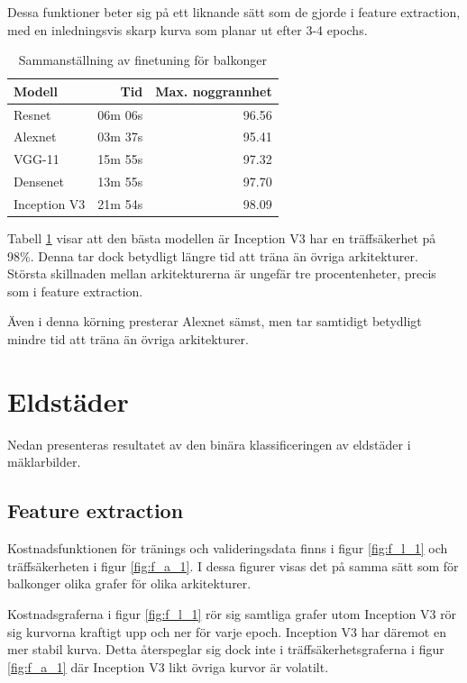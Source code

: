\documentclass[]{kththesis}
\begin{document}
Dessa funktioner beter sig på ett liknande sätt som de gjorde i feature extraction, med en inledningsvis skarp kurva som planar ut efter 3-4 epochs.



\begin{table}[!htbp]
  \centering
  \begin{tabular}{|l|r|r|}
    Modell & Tid & Max. noggrannhet \\ 
    \hline
    Resnet       & 06m 06s & 96.56 \\
    Alexnet      & 03m 37s & 95.41 \\
    VGG-11       & 15m 55s & 97.32 \\
    Densenet     & 13m 55s & 97.70 \\
    Inception V3 & 21m 54s & 98.09 \\
  \end{tabular}
  
  \caption{Sammanställning av finetuning för balkonger}
  \label{fig:sam_2}
  
\end{table}


Tabell \ref{fig:sam_2} visar att den bästa modellen är Inception V3 har en träffsäkerhet på 98\%. 
Denna tar dock betydligt längre tid att träna än övriga arkitekturer. 
Största skillnaden mellan arkitekturerna är ungefär tre procentenheter, precis som i feature extraction.

Även i denna körning presterar Alexnet sämst, men tar samtidigt betydligt mindre tid att träna än övriga arkitekturer.


\section{Eldstäder}
Nedan presenteras resultatet av den binära klassificeringen av eldstäder i mäklarbilder.


\subsection{Feature extraction}
Kostnadsfunktionen för tränings och valideringsdata finns i figur \ref{fig:f_l_1} och träffsäkerheten i figur \ref{fig:f_a_1}.
I dessa figurer visas det på samma sätt som för balkonger olika grafer för olika arkitekturer.

Kostnadsgraferna i figur \ref{fig:f_l_1} rör sig samtliga grafer utom Inception V3 rör sig kurvorna kraftigt upp och ner för varje epoch. 
Inception V3 har däremot en mer stabil kurva. 
Detta återspeglar sig dock inte i träffsäkerhetsgraferna i figur \ref{fig:f_a_1} där Inception V3 likt övriga kurvor är volatilt.
\end{document}
